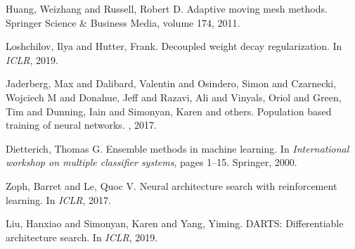\documentclass[11pt,a4paper]{article}
\begin{document}
\begin{thebibliography}{15}
Huang, Weizhang and Russell, Robert D.
\newblock Adaptive moving mesh methods.
\newblock Springer Science \& Business Media, volume 174, 2011.

Loshchilov, Ilya and Hutter, Frank.
\newblock Decoupled weight decay regularization.
\newblock In {\em ICLR}, 2019.

Jaderberg, Max and Dalibard, Valentin and Osindero, Simon and Czarnecki, Wojciech M and Donahue, Jeff and Razavi, Ali and Vinyals, Oriol and Green, Tim and Dunning, Iain and Simonyan, Karen and others.
\newblock Population based training of neural networks.
, 2017.

Dietterich, Thomas G.
\newblock Ensemble methods in machine learning.
\newblock In {\em International workshop on multiple classifier systems}, pages 1--15. Springer, 2000.

Zoph, Barret and Le, Quoc V.
\newblock Neural architecture search with reinforcement learning.
\newblock In {\em ICLR}, 2017.

Liu, Hanxiao and Simonyan, Karen and Yang, Yiming.
\newblock DARTS: Differentiable architecture search.
\newblock In {\em ICLR}, 2019.

\end{thebibliography}
\end{document}
